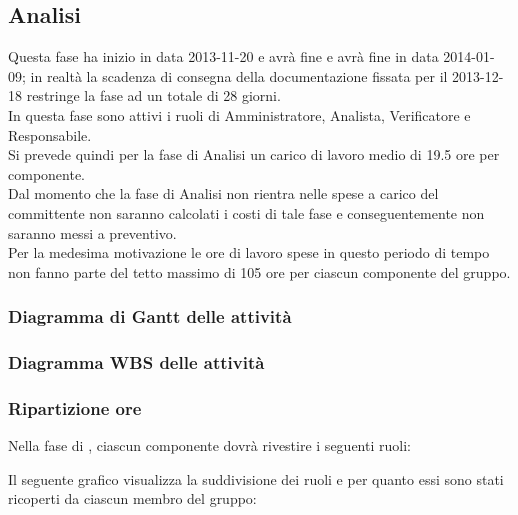 \subsection{Analisi}
Questa fase ha inizio in data 2013-11-20 e avrà fine e avrà fine in data 2014-01-09; in realtà la scadenza di consegna della documentazione fissata per il 2013-12-18 restringe la fase ad un totale di 28 giorni.\\
In questa fase sono attivi i ruoli di Amministratore, Analista, Verificatore e Responsabile.\\
Si prevede quindi per la fase di Analisi un carico di lavoro medio di 19.5 ore per componente.\\
Dal momento che la fase di Analisi non rientra nelle spese a carico del committente non saranno calcolati i costi di tale fase e conseguentemente non saranno messi a preventivo.\\
Per la medesima motivazione le ore di lavoro spese in questo periodo di tempo non fanno parte del tetto massimo di 105 ore per ciascun componente del gruppo.

\subsubsection{Diagramma di Gantt delle attività}

\newpage
\subsubsection{Diagramma WBS delle attività}

\newpage
\subsubsection{Ripartizione ore}

\newpage
Nella fase di , ciascun componente dovrà rivestire i seguenti ruoli:

Il seguente grafico visualizza la suddivisione dei ruoli e per quanto essi sono stati ricoperti da ciascun membro del gruppo:
